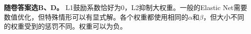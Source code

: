 \textbf{随卷答案选B、D。} L1鼓励系数恰好为0，L2抑制大权重。一般的Elastic Net需要数值优化，但特殊情形可以有显式解。各个权重都使用相同的\ensuremath{\alpha}和\ensuremath{\beta}，但大小不同的权重受到的惩罚不同。权重可以为负。
